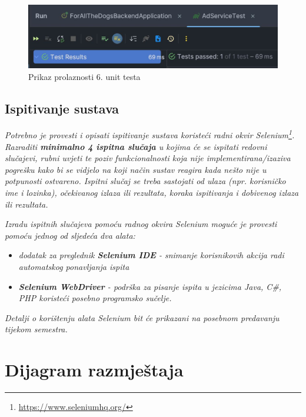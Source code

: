\begin{figure}[H]
			\includegraphics[scale=0.45]{slike/1unitrez.PNG} 
			\centering
			\caption{Prikaz prolaznosti 6. unit testa}
			\label{unit6}
		\end{figure}
		
\pagebreak
	
			\subsection{Ispitivanje sustava}
			
			 \textit{Potrebno je provesti i opisati ispitivanje sustava koristeći radni okvir Selenium\footnote{\url{https://www.seleniumhq.org/}}. Razraditi \textbf{minimalno 4 ispitna slučaja} u kojima će se ispitati redovni slučajevi, rubni uvjeti te poziv funkcionalnosti koja nije implementirana/izaziva pogrešku kako bi se vidjelo na koji način sustav reagira kada nešto nije u potpunosti ostvareno. Ispitni slučaj se treba sastojati od ulaza (npr. korisničko ime i lozinka), očekivanog izlaza ili rezultata, koraka ispitivanja i dobivenog izlaza ili rezultata.\\ }
			 
			 \textit{Izradu ispitnih slučajeva pomoću radnog okvira Selenium moguće je provesti pomoću jednog od sljedeća dva alata:}
			 \begin{itemize}
			 	\item \textit{dodatak za preglednik \textbf{Selenium IDE} - snimanje korisnikovih akcija radi automatskog ponavljanja ispita	}
			 	\item \textit{\textbf{Selenium WebDriver} - podrška za pisanje ispita u jezicima Java, C\#, PHP koristeći posebno programsko sučelje.}
			 \end{itemize}
		 	\textit{Detalji o korištenju alata Selenium bit će prikazani na posebnom predavanju tijekom semestra.}
			
			\eject 
		
		
		\section{Dijagram razmještaja}
			

